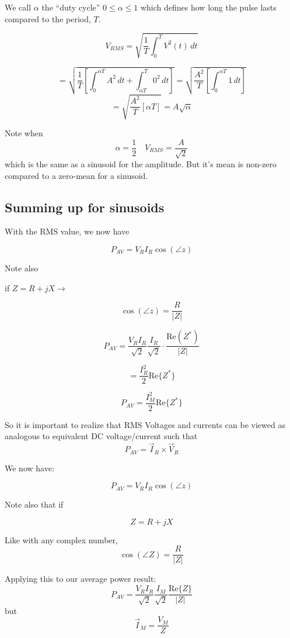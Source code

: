 We call $\alpha $ the ``duty cycle'' \quad $0 \leq \alpha \leq 1$ which defines
how long the pulse lasts compared to the period, $T$.

\[
V_{RMS} = \sqrt{\frac{1}{T} \int_0^T V^2(t) \, dt}
\]

\[
= \sqrt{\frac{1}{T} \left[ \int_0^{\alpha T} A^2 \, dt +  \int_{\alpha T}^T 0^2 \, dt \right]}
= \sqrt{\frac{A^2}{T} [\int_0^{\alpha T} 1 \, dt] }
\]
\[
=\sqrt{\frac{A^2}{T} [ \alpha T] }= A\sqrt{\alpha}
\]

Note when
\[ \alpha = \frac{1}{2} \quad V_{RMS} = \frac{A}{\sqrt{2}}
\]
which is the same as a sinusoid for the amplitude.  But it's mean is non-zero
compared to a zero-mean for a sinusoid.








\subsection{Summing up for sinusoids}
With the RMS value, we now have

\[
P_{AV} = V_R I_R \cos(\angle z)
\]

\noindent Note also

if $Z = R + jX \rightarrow$


\[
\cos(\angle z) = \frac{R}{|Z|}
\]

\[
P_{AV} = \frac{V_R I_R}{\sqrt{2}} \frac{I_R}{\sqrt{2}} \cdot \frac{\text{Re}(Z^*)}{|Z|}
\]

\[
= \frac{I_R^2}{2} \text{Re}\{Z^*\}
\]

\[
P_{AV} = \frac{I_M^2}{2} \text{Re}\{Z^*\}
\]

So it is important to realize that  RMS Voltages and currents can
be viewed as analogous to
equivalent DC voltage/current such that
\[
P_{AV} = \vec I_R\times \vec V_R
\]


 We now have:

\[
P_{AV} = V_R I_R \cos(\angle z)
\]

  Note also that if

\[
Z = R + jX
\]

Like with any complex number,
\[
\cos(\angle Z) = \frac{R}{|Z|}
\]

Applying this to our average power result:
\[
P_{AV} = \frac{V_R I_R}{\sqrt{2}} \frac{I_M}{\sqrt{2}}  \frac{\mathrm{Re}\{Z\} }{|Z|}
\]
but
\[
\vec{I}_M = \frac{V_M}{Z}
\]

